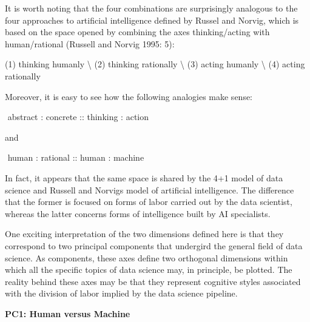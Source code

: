 \documentclass[
  letterpaper,
  DIV=11,
  numbers=noendperiod]{scrreprt}
\newenvironment{Shaded}{\begin{snugshade}}{\end{snugshade}}
\newcommand{\NormalTok}[1]{\textcolor[rgb]{0.00,0.23,0.31}{#1}}
\begin{document}
\begin{Shaded}
\begin{Highlighting}[]
\NormalTok{It is worth noting that the four combinations are surprisingly analogous to the four approaches to artificial intelligence defined by Russel and Norvig, which is based on the space opened by combining the axes thinking/acting with human/rational (Russell and Norvig 1995: 5): }

\NormalTok{(1) thinking humanly \textbackslash{}}
\NormalTok{(2) thinking rationally \textbackslash{}}
\NormalTok{(3) acting humanly \textbackslash{}}
\NormalTok{(4) acting rationally}

\NormalTok{Moreover, it is easy to see how the following analogies make sense: }

\NormalTok{$$}
\NormalTok{abstract : concrete :: thinking : action}
\NormalTok{$$}

\NormalTok{and}

\NormalTok{$$}
\NormalTok{human : rational :: human : machine}
\NormalTok{$$}


\NormalTok{In fact, it appears that the same space is shared by the 4+1 model of data science and Russell and Norvig\textquotesingle{}s model of artificial intelligence. The difference that the former is focused on forms of labor carried out by the data scientist, whereas the latter concerns forms of intelligence built by AI specialists.}
\end{Highlighting}
\end{Shaded}

One exciting interpretation of the two dimensions defined here is that
they correspond to two principal components that undergird the general
field of data science. As components, these axes define two orthogonal
dimensions within which all the specific topics of data science may, in
principle, be plotted. The reality behind these axes may be that they
represent cognitive styles associated with the division of labor implied
by the data science pipeline.

\textbf{PC1: Human versus Machine}
\end{document}
